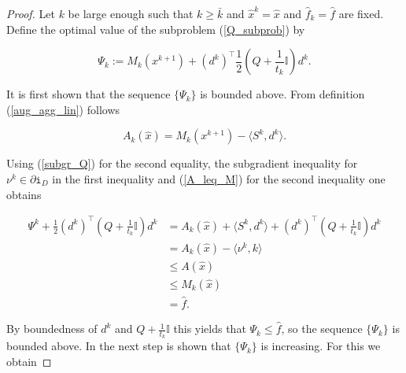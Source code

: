 \begin{proof}
	Let \(k\) be large enough such that \(k \geq \bar{k}\) and \(\hat{x}^k = \hat{x}\) and \(\hat{f}_k=\hat{f}\) are fixed.
	Define the optimal value of the subproblem (\ref{Q_subprob}) by 
	
	\begin{equation}
		\Psi_k := M_k(x^{k+1})+\left(d^k\right)^{\top}\frac{1}{2}\left(Q+\frac{1}{t_k}\mathbb{I}\right)d^k.
		\label{Psi}
	\end{equation}
	
	It is first shown that the sequence \(\{\Psi_k\}\) is bounded above.
	From definition (\ref{aug_agg_lin}) follows

	
	\begin{equation*}
		A_k(\hat{x}) = M_k(x^{k+1})-\langle S^k,d^k \rangle.
	\end{equation*}
	
Using (\ref{subgr_Q}) for the second equality, the subgradient inequality for \(\nu^k \in \partial \mathtt{i}_{D}\) in the first inequality and (\ref{A_leq_M}) for the second inequality  one obtains
	
	\begin{align*}
		\Psi^k+\frac{1}{2}\left(d^{k}\right)^{\top}\left(Q+\frac{1}{t_k}\mathbb{I}\right)d^k &= A_k(\hat{x})+\langle S^k,d^k\rangle + \left(d^{k}\right)^{\top}\left(Q+\frac{1}{t_k}\mathbb{I}\right)d^k \\
		&= A_k(\hat{x})-\langle \nu^k,k \rangle \\
		&\leq A(\hat{x}) \\
		&\leq M_k(\hat{x}) \\
		& = \hat{f}.
	\end{align*}
	
By boundedness of \(d^k\) and \(Q+\frac{1}{t_k}\mathbb{I}\) this yields that \(\Psi_k \leq \hat{f}\), so the sequence \(\{\Psi_k\}\) is bounded above.
	In the next step is shown that \(\{\Psi_k\}\) is increasing. For this we obtain
	

\end{proof}
